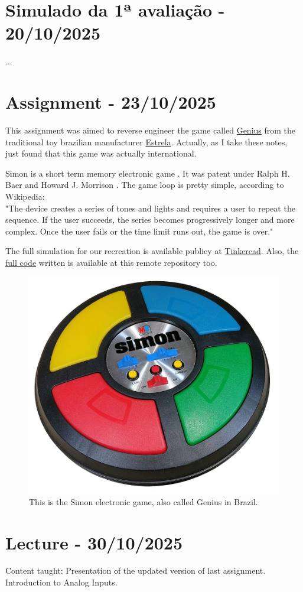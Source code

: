 \documentclass{article}
\begin{document}
\section{Simulado da 1ª avaliação - 20/10/2025}
...

\section{Assignment - 23/10/2025}
This assignment was aimed to reverse engineer the game called \href{https://en.wikipedia.org/wiki/Simon_(game)}{Genius} from the traditional toy brazilian manufacturer \href{https://en.wikipedia.org/wiki/Estrela_(company)}{Estrela}. Actually, as I take these notes, just found that this game was actually international.

Simon is a short term memory electronic game \cite{wikipedia_simon}. It was patent under  Ralph H. Baer and Howard J. Morrison \cite{simon_patent}. The game loop is pretty simple, according to Wikipedia: \\"The device creates a series of tones and lights and requires a user to repeat the sequence. If the user succeeds, the series becomes progressively longer and more complex. Once the user fails or the time limit runs out, the game is over." \cite{wikipedia_simon}

The full simulation for our recreation is available publicy at \href{https://www.tinkercad.com/things/5QbNWprTGky-genius-estrela?sharecode=emlPcyX6GBUJY967Q9LnX9mBZDVs0M2osP7Pup8dmDg}{Tinkercad}. Also, the \href{https://github.com/delellisc/embedded-systems/blob/master/genius-estrela/genius-estrela.ino}{full code}  written is available at this remote repository too.

\begin{figure}
\centering
\includegraphics[width=0.25\linewidth]{./images/simon_electronic_game.jpg}
\caption{\label{fig:simon-game}This is the Simon electronic game, also called Genius in Brazil.}
\end{figure}

\section{Lecture - 30/10/2025}
Content taught: Presentation of the updated version of last assignment. Introduction to Analog Inputs.
\end{document}
